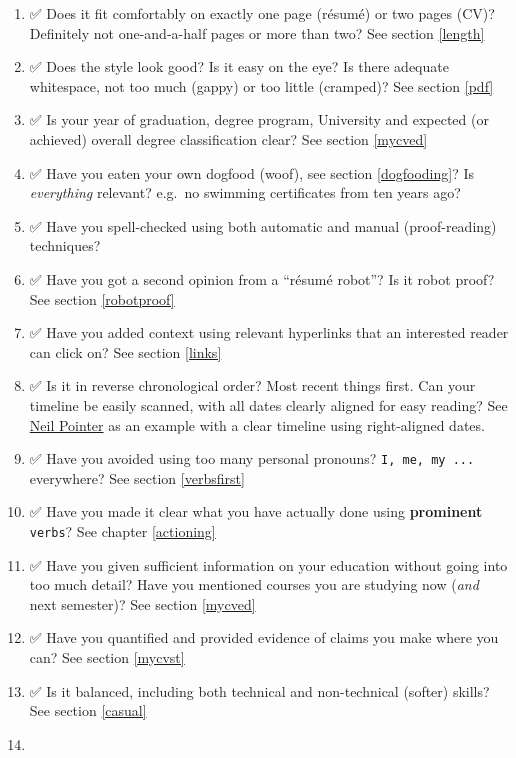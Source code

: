 \documentclass[
]{book}
\providecommand{\tightlist}{%
  \setlength{\itemsep}{0pt}\setlength{\parskip}{0pt}}
\begin{document}
\begin{enumerate}
\def\labelenumi{\arabic{enumi}.}
\tightlist
\item
  ✅ Does it fit comfortably on exactly one page (résumé) or two pages (CV)? Definitely not one-and-a-half pages or more than two? See section \ref{length}
\item
  ✅ Does the style look good? Is it easy on the eye? Is there adequate whitespace, not too much (gappy) or too little (cramped)? See section \ref{pdf}
\item
  ✅ Is your year of graduation, degree program, University and expected (or achieved) overall degree classification clear? See section \ref{mycved}
\item
  ✅ Have you eaten your own dogfood (woof), see section \ref{dogfooding}? Is \emph{everything} relevant? e.g.~no swimming certificates from ten years ago?
\item
  ✅ Have you spell-checked using both automatic and manual (proof-reading) techniques?
\item
  ✅ Have you got a second opinion from a ``résumé robot''? Is it robot proof? See section \ref{robotproof} 🤖
\item
  ✅ Have you added context using relevant hyperlinks that an interested reader can click on? See section \ref{links}
\item
  ✅ Is it in reverse chronological order? Most recent things first. Can your timeline be easily scanned, with all dates clearly aligned for easy reading? See \href{https://www.cdyf.me/Neil_Pointer.pdf}{Neil Pointer} as an example with a clear timeline using right-aligned dates.
\item
  ✅ Have you avoided using too many personal pronouns? \texttt{I,\ me,\ my\ ...} everywhere? See section \ref{verbsfirst}
\item
  ✅ Have you made it clear what you have actually done using \textbf{prominent} \texttt{verbs}? See chapter \ref{actioning}
\item
  ✅ Have you given sufficient information on your education without going into too much detail? Have you mentioned courses you are studying now (\emph{and} next semester)? See section \ref{mycved}
\item
  ✅ Have you quantified and provided evidence of claims you make where you can? See section \ref{mycvst}
\item
  ✅ Is it balanced, including both technical and non-technical (softer) skills? See section \ref{casual}
\item

\end{enumerate}
\end{document}
